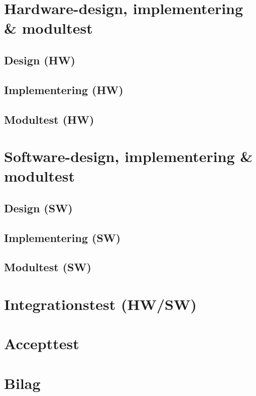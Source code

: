 \documentclass[11pt]{article}
\begin{document}
\vfill
\pagebreak

\section{Hardware-design, implementering \& modultest}
\subsection{Design (HW)}
\subsection{Implementering (HW)}
\subsection{Modultest (HW)}
\vfill
\pagebreak

\section{Software-design, implementering \& modultest}
\subsection{Design (SW)}
\subsection{Implementering (SW)}
\subsection{Modultest (SW)}
\vfill
\pagebreak

\section{Integrationstest (HW/SW)}
\vfill
\pagebreak

\section{Accepttest}
\vfill
\pagebreak

\section{Bilag}
\vfill
\pagebreak
\end{document}
